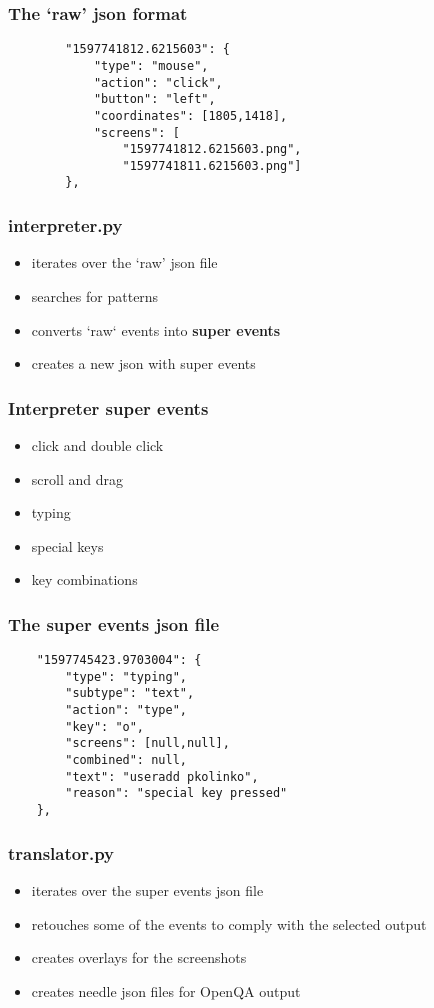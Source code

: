 \documentclass[14pt]{beamer}
\begin{document}
\begin{frame}[fragile]
	\frametitle{The `raw' json format}
	\begin{verbatim}
		"1597741812.6215603": {
		    "type": "mouse",
		    "action": "click",
		    "button": "left",
		    "coordinates": [1805,1418],
		    "screens": [
		        "1597741812.6215603.png",
		        "1597741811.6215603.png"]
		},
	\end{verbatim}

\end{frame}

\begin{frame}
	\frametitle{interpreter.py}
	\begin{itemize}
		\item iterates over the `raw' json file
		\item searches for patterns
		\item converts `raw` events into \textbf{super events}
		\item creates a new json with super events
	\end{itemize}
\end{frame}

\begin{frame}
	\frametitle{Interpreter super events}
	\begin{itemize}
		\item click and double click
		\item scroll and drag
		\item typing
		\item special keys
		\item key combinations
	\end{itemize}
\end{frame}

\begin{frame}[fragile]
	\frametitle{The super events json file}
		\begin{verbatim}
	"1597745423.9703004": {
	    "type": "typing",
	    "subtype": "text",
	    "action": "type",
	    "key": "o",
	    "screens": [null,null],
	    "combined": null,
	    "text": "useradd pkolinko",
	    "reason": "special key pressed"
	},
	\end{verbatim}
	
\end{frame}

\begin{frame}
	\frametitle{translator.py}
	\begin{itemize}
	\item iterates over the super events json file
	\item retouches some of the events to comply with the selected output
	\item creates overlays for the screenshots
	\item creates needle json files for OpenQA output
	\end{itemize}	
\end{frame}
\end{document}
